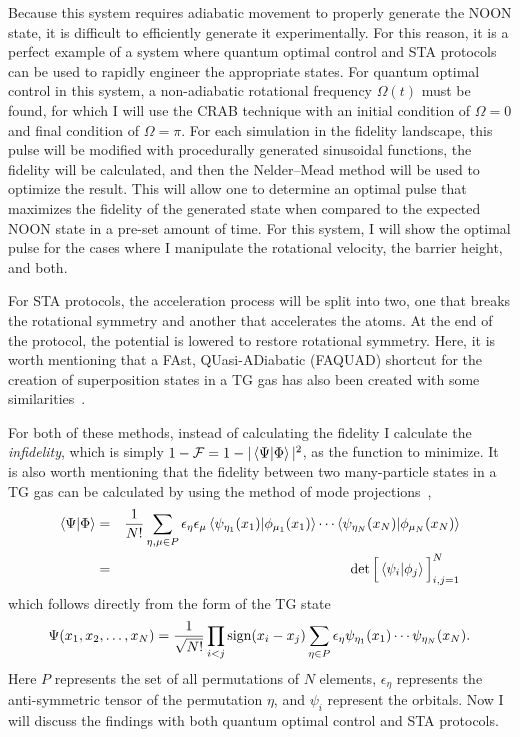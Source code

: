 Because this system requires adiabatic movement to properly generate the NOON state, it is difficult to efficiently generate it experimentally.
For this reason, it is a perfect example of a system where quantum optimal control and STA protocols can be used to rapidly engineer the appropriate states.
For quantum optimal control in this system, a non-adiabatic rotational frequency $\Omega(t)$ must be found, for which I will use the CRAB technique with an initial condition of $\Omega = 0$ and final condition of $\Omega = \pi$.
For each simulation in the fidelity landscape, this pulse will be modified with procedurally generated sinusoidal functions, the fidelity will be calculated, and then the Nelder--Mead method will be used to optimize the result.
This will allow one to determine an optimal pulse that maximizes the fidelity of the generated state when compared to the expected NOON state in a pre-set amount of time.
For this system, I will show the optimal pulse for the cases where I manipulate the rotational velocity, the barrier height, and both.

For STA protocols, the acceleration process will be split into two, one that breaks the rotational symmetry and another that accelerates the atoms.
At the end of the protocol, the potential is lowered to restore rotational symmetry.
Here, it is worth mentioning that a FAst, QUasi-ADiabatic (FAQUAD) shortcut for the creation of superposition states in a TG gas has also been created with some similarities~\cite{garaot2015}.

For both of these methods, instead of calculating the fidelity I calculate the \textit{infidelity}, which is simply $1-\mathcal{F} = 1-|\braket{\Psi|\Phi}|^2$, as the function to minimize.
It is also worth mentioning that the fidelity between two many-particle states in a TG gas can be calculated by using the method of mode projections~\cite{campo2011,lelas2011},
\begin{eqnarray}
\braket{\Psi | \Phi} &=& \frac1{N!} \sum_{\eta, \mu \in P} \epsilon_\eta \epsilon_\mu \braket{\psi_{\eta_1}(x_1) | \phi_{\mu_1}(x_1) } \cdots \braket{ \psi_{\eta_N}(x_N) | \phi_{\mu_N}(x_N) } \nonumber \\
\label{eq:fid}
&=&
\det \Big[ \braket{\psi_i | \phi_j }\Big]_{i,j=1}^N
\end{eqnarray}
which follows directly from the form of the TG state~\cite{girardeau1960}
\begin{equation}
\Psi(x_1,x_2,\ldots, x_N)= \frac1{\sqrt{N!}} \prod_{i<j}\textnormal{sign}(x_i-x_j) \sum_{\eta \in P} \epsilon_\eta \psi_{\eta_1}(x_1)\cdots\psi_{\eta_N}(x_N).
\label{eq:TG}
\end{equation}
Here $P$ represents the set of all permutations of $N$ elements, $\epsilon_\eta$ represents the anti-symmetric tensor of the permutation $\eta$, and $\psi_i$ represent the orbitals.
Now I will discuss the findings with both quantum optimal control and STA protocols.


